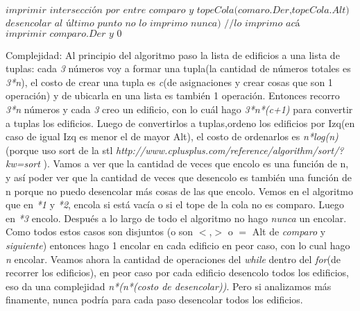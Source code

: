 \documentclass{article}
\begin{document}
\begin{algorithmic}[1]
                \State $\textit{imprimir intersección por entre comparo y topeCola(comaro.Der,topeCola.Alt)}$
                \EndIf
                \State $\textit{desencolar}$    
        \EndFor
        \State $\textit{al último punto no lo imprimo nunca)}$
        \State $\textit{$//$lo imprimo acá}$
        \State $\textit{imprimir comparo.Der y 0}$
\EndProcedure
\end{algorithmic}
\newpage
{\noindent \Huge Complejidad:}
\newline \newline
Al principio del algoritmo paso la lista de edificios a una lista de tuplas:
cada \textit{3} números voy a formar una tupla(la cantidad de números totales es \textit{3*n}), el costo de crear una tupla es \textit{c}(de asignaciones y crear cosas que son 1 operación) y de ubicarla en una lista es también 1 operación.\newline
Entonces recorro \textit{3*n} números y cada \textit{3} creo un edificio, con lo cuál hago \textit{3*n*(c+1)} para convertir a tuplas los edificios.\newline
Luego de convertirlos a tuplas,ordeno los edificios por Izq(en caso de igual Izq es menor el de mayor Alt), el costo de ordenarlos es \textit{n*log(n)} (porque uso sort de la stl \textit{http://www.cplusplus.com/reference/algorithm/sort/?kw=sort} ).\newline
Vamos a ver que la cantidad de veces que encolo es una función de n, y así poder ver que la cantidad de veces que desencolo es también una función de n porque no puedo desencolar más cosas de las que encolo.
Vemos en el algoritmo que en  \textit{*1} y \textit{*2}, encola si está vacía o si el tope de la cola no es comparo. Luego en \textit{*3} encolo. Después a lo largo de todo el algoritmo no hago \textit{nunca} un encolar.\newline
Como todos estos casos son disjuntos (o son $<$,$>$ o $=$ Alt de \textit{comparo} y \textit{siguiente}) entonces hago 1 encolar en cada edificio en peor caso, con lo cual hago \textit{n} encolar. 
\newline
Veamos ahora la cantidad de operaciones del \textit{while} dentro del \textit{for}(de recorrer los edificios), en peor caso por cada edificio desencolo todos los edificios, eso da una complejidad \textit{n*(n*(costo de desencolar))}. Pero si analizamos más finamente, nunca podría para cada paso desencolar todos los edificios.\newline
\end{document}
